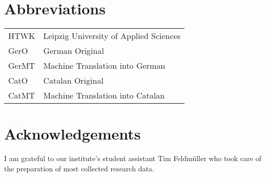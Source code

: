 \documentclass[output=paper,colorlinks,citecolor=brown]{langscibook}
\begin{document}
\section*{Abbreviations}

\begin{tabular}{ll}
  {HTWK} & Leipzig University of Applied Sciences\\
   {GerO} & German Original\\
 {GerMT} & Machine Translation into German\\
 {CatO} & Catalan Original\\
 {CatMT} & Machine Translation into Catalan\\
\end{tabular}

\section*{Acknowledgements}
I am grateful to our institute's student assistant Tim Feldmüller who took care of the preparation of most collected research data.

{\sloppy\printbibliography[heading=subbibliography,notkeyword=this]}
\end{document}
